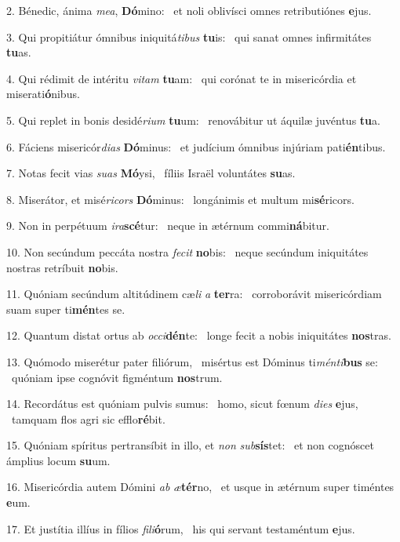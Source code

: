 2. Bénedic, ánima \textit{me}\textit{a}, \textbf{Dó}mino: \ast\  et noli oblivísci omnes retributiónes \textbf{e}jus.\

3. Qui propitiátur ómnibus iniquitá\textit{ti}\textit{bus} \textbf{tu}is: \ast\  qui sanat omnes infirmitátes \textbf{tu}as.\

4. Qui rédimit de intéritu \textit{vi}\textit{tam} \textbf{tu}am: \ast\  qui corónat te in misericórdia et miserati\textbf{ó}nibus.\

5. Qui replet in bonis desidé\textit{ri}\textit{um} \textbf{tu}um: \ast\  renovábitur ut áquilæ juvéntus \textbf{tu}a.\

6. Fáciens misericór\textit{di}\textit{as} \textbf{Dó}minus: \ast\  et judícium ómnibus injúriam pati\textbf{én}tibus.\

7. Notas fecit vias \textit{su}\textit{as} \textbf{Mó}ysi, \ast\  fíliis Israël voluntátes \textbf{su}as.\

8. Miserátor, et misé\textit{ri}\textit{cors} \textbf{Dó}minus: \ast\  longánimis et multum mi\textbf{sé}ricors.\

9. Non in perpétuum \textit{i}\textit{ra}\textbf{scé}tur: \ast\  neque in ætérnum commi\textbf{ná}bitur.\

10. Non secúndum peccáta nostra \textit{fe}\textit{cit} \textbf{no}bis: \ast\  neque secúndum iniquitátes nostras retríbuit \textbf{no}bis.\

11. Quóniam secúndum altitúdinem cæ\textit{li} \textit{a} \textbf{ter}ra: \ast\  corroborávit misericórdiam suam super ti\textbf{mén}tes se.\

12. Quantum distat ortus ab \textit{oc}\textit{ci}\textbf{dén}te: \ast\  longe fecit a nobis iniquitátes \textbf{nos}tras.\

13. Quómodo miserétur pater filiórum, \dag\  misértus est Dóminus ti\textit{mén}\textit{ti}\textbf{bus} se: \ast\  quóniam ipse cognóvit figméntum \textbf{nos}trum.\

14. Recordátus est quóniam pulvis sumus: \dag\  homo, sicut fœnum \textit{di}\textit{es} \textbf{e}jus, \ast\  tamquam flos agri sic efflo\textbf{ré}bit.\

15. Quóniam spíritus pertransíbit in illo, et \textit{non} \textit{sub}\textbf{sís}tet: \ast\  et non cognóscet ámplius locum \textbf{su}um.\

16. Misericórdia autem Dómini \textit{ab} \textit{æ}\textbf{tér}no, \ast\  et usque in ætérnum super timéntes \textbf{e}um.\

17. Et justítia illíus in fílios \textit{fi}\textit{li}\textbf{ó}rum, \ast\  his qui servant testaméntum \textbf{e}jus.\

